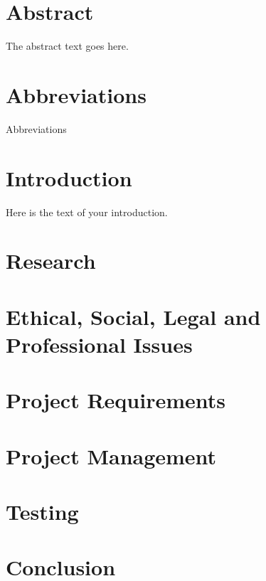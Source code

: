 \documentclass{report}
\begin{document}
\chapter*{Abstract}
The abstract text goes here.



\chapter*{Abbreviations}
Abbreviations



\tableofcontents{}

\chapter{Introduction}
Here is the text of your introduction.

\chapter{Research}

\chapter{Ethical, Social, Legal and Professional Issues}

\chapter{Project Requirements}

\chapter{Project Management}

\chapter{Testing}

\chapter{Conclusion}

{}

\end{document}
